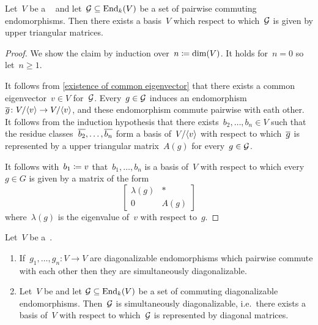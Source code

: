 \begin{corollary}
  \label{simultaneously triagbar}
  Let~$V$ be a {\fd}~{\kvs} and let~$\mathcal{G} \subseteq \operatorname{End}_k(V)$ be a set of pairwise commuting endomorphisms.
  Then there exists a basis~$V$ which respect to which~$\mathcal{G}$ is given by upper triangular matrices.
\end{corollary}


\begin{proof}
  We show the claim by induction over~$n \coloneqq \dim(V)$.
  It holds for~$n = 0$ so let~$n \geq 1$.
  
  It follows from \cref{existence of common eigenvector} that there exists a common eigenvector~$v \in V$ for~$\mathcal{G}$.
  Every~$g \in \mathcal{G}$ induces an endomorphism~$\overline{g} \colon V/\langle v\rangle \to V/\langle v\rangle$, and these endomorphism commute pairwise with eath other.
  It follows from the induction hypothesis that there exists~$b_2, \dotsc, b_n \in V$ such that the residue classes~$\overline{b_2}, \dotsc, \overline{b_n}$ form a basis of~$V/\langle v\rangle$ with respect to which~$\overline{g}$ is represented by a upper triangular matrix~$A(g)$ for every~$g \in \mathcal{G}$.
  
  It follows with~$b_1 \coloneqq v$ that~$b_1, \dotsc, b_n$ is a basis of~$V$ with respect to which every~$g \in G$ is given by a matrix of the form
  \[
    \begin{bmatrix}
      \lambda(g)  & *     \\
      0           & A(g)
    \end{bmatrix}
  \]
  where~$\lambda(g)$ is the eigenvalue of~$v$ with respect to~$g$.
\end{proof}


\begin{lemma}
  \label{simultaneous diagbar}
  Let~$V$ be a~{\kvs}.
  \begin{enumerate}
    \item
      \label{simultaneous diagbar for finitely many}
      If~$g_1, \dotsc, g_n \colon V \to V$ are diagonalizable endomorphisms which pairwise commute with each other then they are simultaneously diagonalizable.
    \item
      Let~$V$ be {\fd} and let $\mathcal{G} \subseteq \operatorname{End}_k(V)$ be a set of commuting diagonalizable endomorphisms.
      Then~$\mathcal{G}$ is simultaneously diagonalizable, i.e.\ there exists a basis of~$V$ with respect to which~$\mathcal{G}$ is represented by diagonal matrices.
  \end{enumerate}
\end{lemma}


